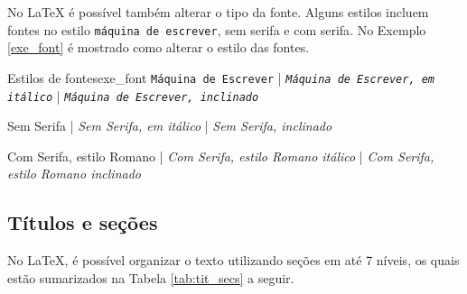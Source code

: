 No \LaTeX{} é possível também alterar o tipo da fonte. Alguns estilos incluem fontes no estilo \texttt{máquina de escrever}, \textsf{sem serifa} e \textrm{com serifa}. No Exemplo \ref{exe_font} é mostrado como alterar o estilo das fontes.

\begin{texexptitled}[breakable,center lower,enhanced,middle=2mm]{Estilos de fontes}{exe_font}
\texttt{Máquina de Escrever} | \texttt{\textit{Máquina de Escrever, em itálico}} | \texttt{\textsl{Máquina de Escrever, inclinado}}

\textsf{Sem Serifa} | \textsf{\textit{Sem Serifa, em itálico}} | \textsf{\textsl{Sem Serifa, inclinado}}

\textrm{Com Serifa, estilo Romano} | \textrm{\textit{Com Serifa, estilo Romano itálico}} | \textrm{\textsl{Com Serifa, estilo Romano inclinado}}
\end{texexptitled}

\subsection{Títulos e seções}
\label{sec:tit_secs}

No \LaTeX{}, é possível organizar o texto utilizando seções em até 7 níveis, os quais estão sumarizados na Tabela \ref{tab:tit_secs} a seguir.

